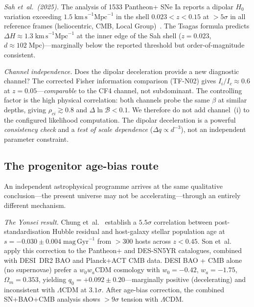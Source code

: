 \emph{Sah et~al.\ (2025).}
The analysis of 1533 Pantheon+ SNe
Ia reports a dipolar $H_0$ variation exceeding
$1.5\;\mathrm{km\,s}^{-1}\mathrm{Mpc}^{-1}$ in the shell
$0.023 < z < 0.15$ at $>5\sigma$ in all reference frames
(heliocentric, CMB, Local Group)~\cite{Sah2025}.  The Tsagas
formula predicts $\Delta H \approx 1.3\;\mathrm{km\,s}^{-1}
\mathrm{Mpc}^{-1}$ at the inner edge of the Sah shell
($z = 0.023$, $d \approx 102\;\mathrm{Mpc}$)---marginally
below the reported threshold but order-of-magnitude consistent.

\emph{Channel independence.}
Does the dipolar deceleration provide a new diagnostic channel?
The corrected Fisher information comparison (TF-N02) gives
$I_i/I_c \approx 0.6$ at $z = 0.05$---\emph{comparable} to the
CF4 channel, not subdominant.  The controlling factor is the high
physical correlation: both channels probe the same $\beta$ at
similar depths, giving $\rho_{ci} \gtrsim 0.8$ and
$\Delta\ln\mathcal{B} < 0.1$.  We therefore do not add
channel~(i) to the configured likelihood computation.  The dipolar deceleration
is a powerful \emph{consistency check} and a \emph{test of
scale dependence} ($\Delta q \propto d^{-3}$), not an
independent parameter constraint.


\subsection{The progenitor age-bias route}
\label{sec:disc-age-bias}

An independent astrophysical programme arrives at the same
qualitative conclusion---the present universe may not be
accelerating---through an entirely different mechanism.

\emph{The Yonsei result.}
Chung et~al.~\cite{Chung2025} establish a $5.5\sigma$ correlation
between post-standardisation Hubble residual and host-galaxy
stellar population age at $s = -0.030 \pm 0.004\;\mathrm{mag\,
Gyr}^{-1}$ from $>300$ hosts across $z < 0.45$.
Son et~al.~\cite{Son2025} apply this correction to the
Pantheon+ and DES-SN5YR catalogues, combined with DESI~DR2 BAO
and Planck+ACT CMB data.  DESI BAO + CMB alone
(no supernovae) prefer a $w_0w_a$CDM cosmology with
$w_0 = -0.42$, $w_a = -1.75$, $\Omega_m = 0.353$, yielding
$q_0 = +0.092 \pm 0.20$---marginally positive (decelerating)
and inconsistent with $\Lambda$CDM at $3.1\sigma$.  After
age-bias correction, the combined SN+BAO+CMB analysis shows
$> 9\sigma$ tension with $\Lambda$CDM.

